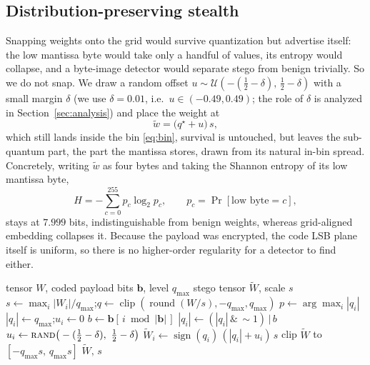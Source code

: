 \documentclass[10pt,journal]{IEEEtran}
\theoremstyle{remark}
\begin{document}
\subsection{Distribution-preserving stealth}
Snapping weights onto the grid would survive quantization but advertise itself: the
low mantissa byte would take only a handful of values, its entropy would collapse, and
a byte-image detector would separate stego from benign trivially. So we do not snap.
We draw a random offset $u\sim\mathcal{U}(-(\tfrac12-\delta),\,\tfrac12-\delta)$ with a
small margin $\delta$ (we use $\delta=0.01$, i.e.\ $u\in(-0.49,0.49)$; the role of $\delta$
is analyzed in Section~\ref{sec:analysis}) and place the weight at
\begin{equation}\label{eq:embed}
\tilde w=\big(q^\star+u\big)\,s,
\end{equation}
which still lands inside the bin \eqref{eq:bin}, survival is untouched, but
leaves the sub-quantum part, the part the mantissa stores, drawn from its natural
in-bin spread. Concretely, writing $\tilde w$ as four bytes and taking the Shannon
entropy of its low mantissa byte,
\begin{equation}\label{eq:entropy}
H=-\sum_{c=0}^{255} p_c\log_2 p_c,\qquad p_c=\Pr[\text{low byte}=c],
\end{equation}
stays at $7.999$ bits, indistinguishable from benign weights, whereas grid-aligned
embedding collapses it. Because the payload was encrypted, the code LSB plane itself is
uniform, so there is no higher-order regularity for a detector to find either.

\begin{algorithm}[t]
\caption{Quantization-aware stealthy embedding (per weight tensor)}
\label{alg:embed}
\begin{algorithmic}[1]
\Require tensor $W$, coded payload bits $\mathbf b$, level $q_{\max}$
\Ensure stego tensor $\tilde W$, scale $s$
\State $s\gets \max_i|W_i|/q_{\max}$;\quad $q\gets\operatorname{clip}(\operatorname{round}(W/s),-q_{\max},q_{\max})$
\State $p\gets\arg\max_i|q_i|$ 
   
    \State $|q_i|\gets q_{\max}$;\quad $u_i\gets 0$
  \Else
    \State $b\gets \mathbf b[\,i \bmod |\mathbf b|\,]$ 
    \State $|q_i|\gets(|q_i|\,\&\,{\sim}1)\,\vert\,b$ 
    \State $u_i\gets\textsc{rand}\big(-(\tfrac12-\delta),\ \tfrac12-\delta\big)$ 
  \EndIf
  \State $\tilde W_i\gets\operatorname{sign}(q_i)\,(|q_i|+u_i)\,s$
\EndFor
\State clip $\tilde W$ to $[-q_{\max}s,\,q_{\max}s]$ 
\State \Return $\tilde W,\,s$
\end{algorithmic}
\end{algorithm}
\end{document}
